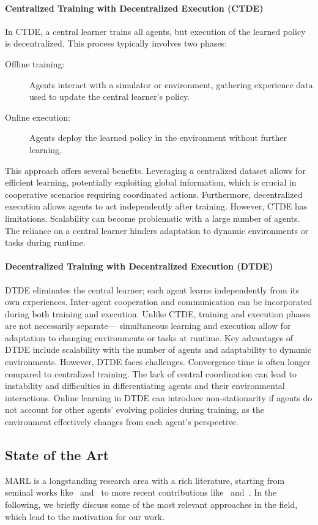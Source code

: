 \documentclass[sigconf]{acmart}
\begin{document}
\paragraph{Centralized Training with Decentralized Execution (CTDE)}
In CTDE, a central learner trains all agents, 
but execution of the learned policy is decentralized. 
This process typically involves two phases:
\begin{description}
  \item[Offline training:] Agents interact with a simulator or environment, gathering experience data used to update the central learner's policy.
  \item[Online execution:] Agents deploy the learned policy in the environment without further learning.
\end{description}
This approach offers several benefits.  
Leveraging a centralized dataset allows for efficient learning, 
potentially exploiting global information, 
which is crucial in cooperative scenarios requiring coordinated actions. 
Furthermore, decentralized execution allows agents to act independently after training.
%
However, CTDE has limitations. 
Scalability can become problematic with a large number of agents. 
The reliance on a central learner hinders adaptation to dynamic environments or tasks during runtime.
\sloppy
\paragraph{Decentralized Training with Decentralized Execution (DTDE)}
DTDE eliminates the central learner; each agent learns independently from its own experiences.
Inter-agent cooperation and communication can be incorporated during both training and execution. 
Unlike CTDE, training and execution phases are not necessarily separate---
simultaneous learning and execution allow for adaptation to changing environments or tasks at runtime.
%
Key advantages of DTDE include scalability with the number of agents and adaptability to dynamic environments.
%
However, DTDE faces challenges. 
Convergence time is often longer compared to centralized training. 
The lack of central coordination can lead to instability and difficulties in differentiating agents and their environmental interactions. 
Online learning in DTDE can introduce non-stationarity if agents do not account for other agents' evolving policies during training, 
as the environment effectively changes from each agent's perspective.

\subsection{State of the Art}\label{sec:sota}
MARL is a longstanding research area with a rich literature, starting 
from seminal works like~\cite{tan1993multi} and~\cite{busoniu2008comprehensive} to more recent contributions like~\cite{gronauer2022multi} and~\cite{canese2021multi}.
%
In the following, we briefly discuss some of the most relevant approaches in the field, which lead to the motivation for our work.
\end{document}
